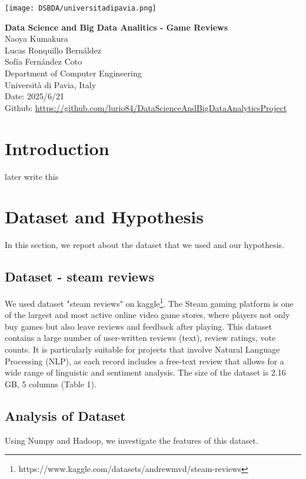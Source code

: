 \documentclass[a4paper,twocolumn,11pt]{article}
\begin{document}
\begin{center}
  \texttt{[image: DSBDA/universitadipavia.png]}

  {\LARGE \textbf{Data Science and Big Data Analitics - Game Reviews}}\\[1em]
  {\large Naoya Kumakura}\\
  {\large Lucas Ronquillo Bernáldez } \\ 
  {\large Sofía Fernández Coto } \\
  {\normalsize Department of Computer Engineering\\Università di Pavia, Italy}\\
  {\normalsize Date: 2025/6/21}\\
  {\normalsize Github: \url{https://github.com/lurio84/DataScienceAndBigDataAnalyticsProject}}
  
\end{center}

\vspace{1em}

\section{Introduction}
later write this
\section{Dataset and Hypothesis}
In this section, we report about the dataset that we used and our hypothesis.
\subsection{Dataset - steam reviews}

We used dataset "steam reviews" on kaggle\footnote{https://www.kaggle.com/datasets/andrewmvd/steam-reviews}.
The Steam gaming platform is one of the largest and most active online video game stores, where players not only buy games but also leave reviews and feedback after playing. This dataset contains a large number of user-written reviews (text), review ratings, vote counts. It is particularly suitable for projects that involve Natural Language Processing (NLP), as each record includes a free-text review that allows for a wide range of linguistic and sentiment analysis. The size of the dataset is 2.16 GB, 5 columns (Table 1).

\subsection{Analysis of Dataset}
Using Numpy and Hadoop, we investigate the features of this dataset.
\end{document}
